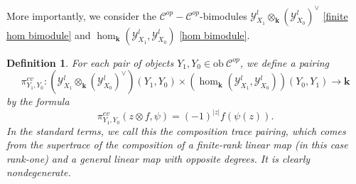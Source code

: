 \documentclass[11pt]{amsproc}
\def\K{{\mathbf{k}}}
\def\Y{\mathcal{Y}}
\def\cc{\mathcal{C}}
\def\ob{\mathrm{ob\ }}
\newtheorem{defn}[lem]{Definition}
\theoremstyle{remark}
\numberwithin{equation}{section}
\begin{document}
More importantly, we consider the $\cc^{op}-\cc^{op}$-bimodules $\Y^{l}_{X_{1}} \otimes_{\K} (\Y^{l}_{X_{0}})^{\vee}$ \eqref{finite hom bimodule} and $\hom_{\K}(\Y^{l}_{X_{1}}, \Y^{l}_{X_{0}})$ \eqref{hom bimodule}.

\begin{defn}\label{def: trace pairing}
For each pair of objects $Y_{1}, Y_{0} \in \ob \cc^{op}$, we define a pairing
\begin{equation}\label{hom pairing}
\pi^{ev}_{Y_{1}, Y_{0}}: (\Y^{l}_{X_{1}} \otimes_{\K} (\Y^{l}_{X_{0}})^{\vee})(Y_{1}, Y_{0}) \times (\hom_{\K}(\Y^{l}_{X_{1}}, \Y^{l}_{X_{0}}))(Y_{0}, Y_{1}) \to \K
\end{equation}
by the formula
\begin{equation}\label{hom pairing formula}
\pi^{ev}_{Y_{1}, Y_{0}}( z \otimes f, \psi) = (-1)^{|z|} f(\psi(z)).
\end{equation}
In the standard terms, we call this the composition trace pairing,
which comes from the supertrace of the composition of a finite-rank linear map (in this case rank-one) and a general linear map with opposite degrees.
It is clearly nondegenerate.
\end{defn}
\end{document}
